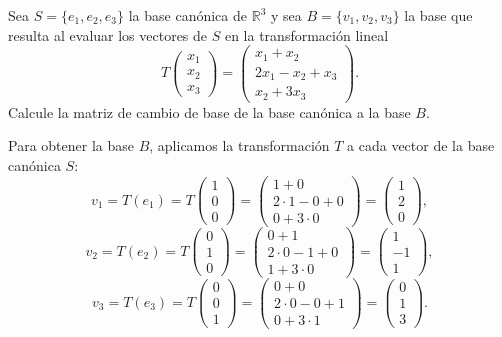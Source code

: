\begin{prob}
Sea $S = \{e_1, e_2, e_3\}$ la base canónica de $\mathbb{R}^3$ y sea $B = \{v_1, v_2, v_3\}$ la base que resulta al evaluar los vectores de $S$ en la transformación lineal
\[
T\begin{pmatrix} x_1 \\ x_2 \\ x_3 \end{pmatrix} = \begin{pmatrix} x_1 + x_2 \\ 2x_1 - x_2 + x_3 \\ x_2 + 3x_3 \end{pmatrix}.
\]
Calcule la matriz de cambio de base de la base canónica a la base $B$.
\begin{myproof}
Para obtener la base $B$, aplicamos la transformación $T$ a cada vector de la base canónica $S$:
\[
v_1 = T(e_1) = T\begin{pmatrix}1 \\ 0 \\ 0\end{pmatrix} = \begin{pmatrix}1 + 0 \\ 2 \cdot 1 - 0 + 0 \\ 0 + 3 \cdot 0 \end{pmatrix} = \begin{pmatrix}1 \\ 2 \\ 0 \end{pmatrix},
\]
\[
v_2 = T(e_2) = T\begin{pmatrix}0 \\ 1 \\ 0\end{pmatrix} = \begin{pmatrix}0 + 1 \\ 2 \cdot 0 - 1 + 0 \\ 1 + 3 \cdot 0 \end{pmatrix} = \begin{pmatrix}1 \\ -1 \\ 1 \end{pmatrix},
\]
\[
v_3 = T(e_3) = T\begin{pmatrix}0 \\ 0 \\ 1\end{pmatrix} = \begin{pmatrix}0 + 0 \\ 2 \cdot 0 - 0 + 1 \\ 0 + 3 \cdot 1 \end{pmatrix} = \begin{pmatrix}0 \\ 1 \\ 3 \end{pmatrix}.
\]


\end{myproof}
\end{prob}
